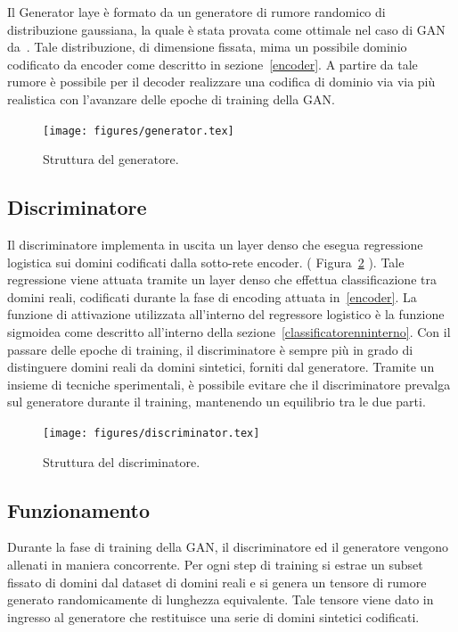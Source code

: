Il Generator laye è formato da un generatore di rumore randomico di distribuzione gaussiana, la quale è stata provata come ottimale nel caso di GAN da~\cite{gaussian}. Tale distribuzione, di dimensione fissata, mima un possibile dominio codificato da encoder come descritto in sezione~\ref{encoder}. A partire da tale rumore è possibile per il decoder realizzare una codifica di dominio via via più realistica con l'avanzare delle epoche di training della GAN.

\begin{figure}[!p]
    \centering
	\texttt{[image: figures/generator.tex]}
	\caption{Struttura del generatore.
\label{fig:generator}}
\end{figure}

\subsection{Discriminatore}
\label{discriminator}
Il discriminatore implementa in uscita un layer denso che esegua regressione logistica sui domini codificati dalla sotto-rete encoder. ( Figura~\ref{fig:discriminator} ). Tale regressione viene attuata tramite un layer denso che effettua classificazione tra domini reali, codificati durante la fase di encoding attuata in~\ref{encoder}. La funzione di attivazione utilizzata all'interno del regressore logistico è la funzione sigmoidea come descritto all'interno della sezione~\ref{classificatorenninterno}. Con il passare delle epoche di training, il discriminatore è sempre più in grado di distinguere domini reali da domini sintetici, forniti dal generatore. Tramite un insieme di tecniche sperimentali, è possibile evitare che il discriminatore prevalga sul generatore durante il training, mantenendo un equilibrio tra le due parti. 

\begin{figure}[!p]
    \centering
	\texttt{[image: figures/discriminator.tex]}
	\caption{Struttura del discriminatore.
\label{fig:discriminator}}
\end{figure}

\subsection{Funzionamento}
Durante la fase di training della GAN, il discriminatore ed il generatore vengono allenati in maniera concorrente. Per ogni step di training si estrae un subset fissato di domini dal dataset di domini reali e si genera un tensore di rumore generato randomicamente di lunghezza equivalente. Tale tensore viene dato in ingresso al generatore che restituisce una serie di domini sintetici codificati.

